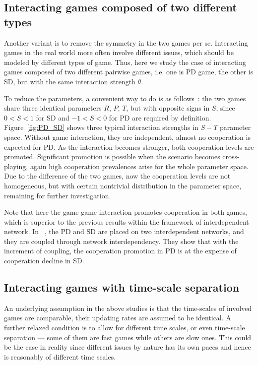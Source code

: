 \documentclass[showpacs,superscriptaddress,reprint,nofootinbib,amsmath,amssymb,aps,pre]{revtex4-1}
\begin{document}
\subsection{Interacting games composed of two different types}\label{subsec:PD_SD}
Another variant is to remove the symmetry in the two games per se.
Interacting games in the real world more often involve different issues, which should be modeled by different types of game.  Thus, here we study the case of interacting games composed of two different pairwise games, i.e. one is PD game, the other is SD, but with the same interaction strength $\theta$.  

To reduce the parameters, a convenient way to do is as follows~\cite{santos2014biased,wang2014evolutionary}: the two games share three identical parameters $R$, $P$, $T$, but with opposite signs in $S$, since $0<S<1$ for SD and $-1<S<0$ for PD are required by definition. Figure~\ref{fig:PD_SD} shows three typical interaction strengths in $S-T$ parameter space. Without game interaction, they are independent, almost no cooperation is expected for PD. As the interaction becomes stronger, both cooperation levels are promoted. Significant promotion is possible when the scenario becomes cross-playing, again high cooperation prevalences arise for the whole parameter space. Due to the difference of the two games, now the cooperation levels are not homogeneous, but with certain nontrivial distribution in the parameter space, remaining for further investigation.    

Note that here the game-game interaction promotes cooperation in both games, which is superior to the previous results within the framework of interdependent network. In ~\cite{santos2014biased,wang2014evolutionary}, the PD and SD are placed on two interdependent networks, and they are coupled through network interdependency.  They show that with the increment of coupling, the cooperation promotion in PD is at the expense of cooperation decline in SD.

\subsection{Interacting games with time-scale separation}\label{subsec:tss}
An underlying assumption in the above studies is that the time-scales of involved games are comparable, their updating rates are assumed to be identical. A further relaxed condition is to allow for different time scales, or even time-scale separation --- some of them are fast games while others are slow ones. This could be the case in reality since different issues by nature has its own paces and hence is reasonably of different time scales.
\end{document}
